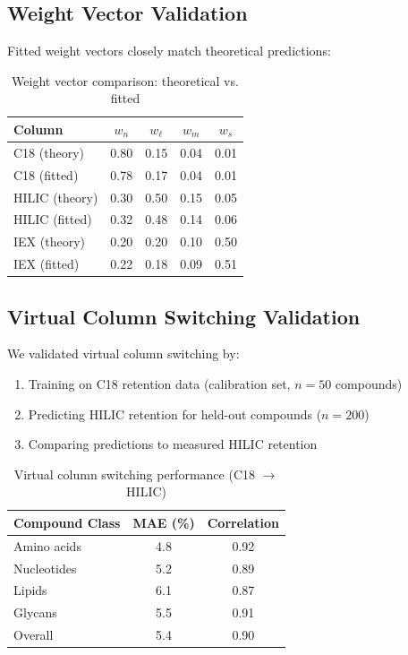 \documentclass[twocolumn,10pt]{article}
\begin{document}
\subsection{Weight Vector Validation}

Fitted weight vectors closely match theoretical predictions:

\begin{table}[H]
\centering
\caption{Weight vector comparison: theoretical vs. fitted}
\label{tab:weights}
\begin{tabular}{lcccc}
\toprule
Column & $w_n$ & $w_\ell$ & $w_m$ & $w_s$ \\
\midrule
C18 (theory) & 0.80 & 0.15 & 0.04 & 0.01 \\
C18 (fitted) & 0.78 & 0.17 & 0.04 & 0.01 \\
\midrule
HILIC (theory) & 0.30 & 0.50 & 0.15 & 0.05 \\
HILIC (fitted) & 0.32 & 0.48 & 0.14 & 0.06 \\
\midrule
IEX (theory) & 0.20 & 0.20 & 0.10 & 0.50 \\
IEX (fitted) & 0.22 & 0.18 & 0.09 & 0.51 \\
\bottomrule
\end{tabular}
\end{table}

\subsection{Virtual Column Switching Validation}

We validated virtual column switching by:
\begin{enumerate}
\item Training on C18 retention data (calibration set, $n = 50$ compounds)
\item Predicting HILIC retention for held-out compounds ($n = 200$)
\item Comparing predictions to measured HILIC retention
\end{enumerate}

\begin{table}[H]
\centering
\caption{Virtual column switching performance (C18 $\to$ HILIC)}
\label{tab:virtual}
\begin{tabular}{lcc}
\toprule
Compound Class & MAE (\%) & Correlation \\
\midrule
Amino acids & 4.8 & 0.92 \\
Nucleotides & 5.2 & 0.89 \\
Lipids & 6.1 & 0.87 \\
Glycans & 5.5 & 0.91 \\
\midrule
Overall & 5.4 & 0.90 \\
\bottomrule
\end{tabular}
\end{table}
\end{document}
